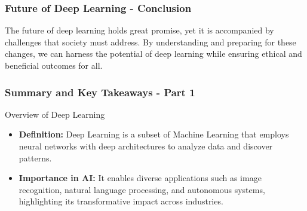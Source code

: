 \documentclass[aspectratio=169]{beamer}
\begin{document}
\begin{frame}[fragile]
    \frametitle{Future of Deep Learning - Conclusion}
    The future of deep learning holds great promise, yet it is accompanied by challenges that society must address. By understanding and preparing for these changes, we can harness the potential of deep learning while ensuring ethical and beneficial outcomes for all.
\end{frame}

\begin{frame}[fragile]
    \frametitle{Summary and Key Takeaways - Part 1}
    \begin{block}{Overview of Deep Learning}
        \begin{itemize}
            \item \textbf{Definition:} 
                Deep Learning is a subset of Machine Learning that employs neural networks with deep architectures to analyze data and discover patterns.
            \item \textbf{Importance in AI:} 
                It enables diverse applications such as image recognition, natural language processing, and autonomous systems, highlighting its transformative impact across industries.
        \end{itemize}
    \end{block}
\end{frame}
\end{document}
